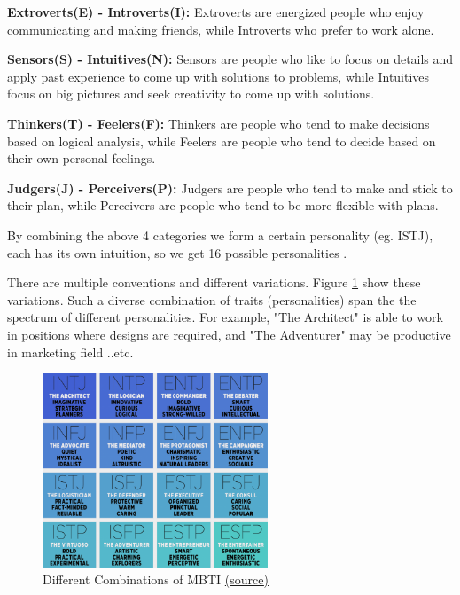 \textbf{Extroverts(E) - Introverts(I): }Extroverts are energized people who enjoy communicating and making friends, while Introverts who prefer to work alone.\newline

\textbf{Sensors(S) - Intuitives(N): }Sensors are people who like to focus on details and apply past experience to come up with solutions to problems, while Intuitives focus on big pictures and seek creativity to come up with solutions.\newline

\textbf{Thinkers(T) - Feelers(F): }Thinkers are people who tend to make decisions based on logical analysis, while Feelers are people who tend to decide based on their own personal feelings.\newline

\textbf{Judgers(J) - Perceivers(P): }Judgers are people who tend to make and stick to their plan, while  Perceivers are people who tend to be more flexible with plans.\newline

By combining the above 4 categories we form a certain personality (eg. ISTJ), each has its own intuition, so we get 16 possible personalities \cite{MBTI}.

There are multiple conventions and different variations. Figure \ref{fig:mbti_ls_1} show these variations. Such a diverse combination of traits (personalities) span the the spectrum of different personalities. For example, "The Architect" is able to work in positions where designs are required, and "The Adventurer" may be productive in marketing field ..etc.



\begin{figure}[h]
\centering
\includegraphics[width=0.6\textwidth]{images/MBTI.png}
\caption{Different Combinations of MBTI \href{https://practicalpie.com/wp-content/uploads/2021/03/Printable-Myers-Briggs-Matrix-768x660.png}{(\underline{source})}}
\label{fig:mbti_ls_1}
\end{figure}


